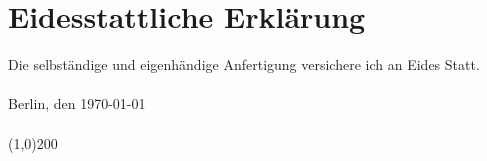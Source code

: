 
\chapter*{Eidesstattliche Erkl\"{a}rung}
\thispagestyle{empty}
\vfill
Die selbst\"{a}ndige und eigenh\"{a}ndige Anfertigung versichere ich an Eides Statt.\\
\vspace{10pt}\\
Berlin, den \today{}\\
\vspace{10pt}\\
\line(1,0){200}
\clearpage




